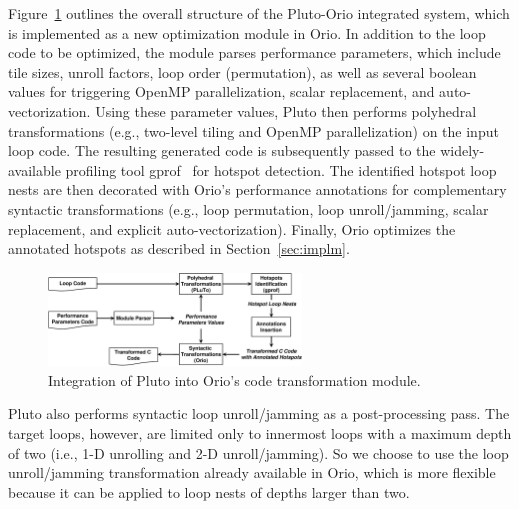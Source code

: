 Figure~\ref{fig:pluto-orio} outlines the overall structure of the Pluto-Orio
integrated system, which is implemented as a new optimization module in
Orio.
In addition to the loop code to be optimized, the module parses performance
parameters, which include tile sizes, unroll factors, loop order
(permutation), as well as several boolean values for triggering OpenMP
parallelization, scalar replacement, and auto-vectorization. Using these
parameter values, Pluto then performs polyhedral transformations (e.g.,
two-level tiling and OpenMP parallelization) on the input loop code. The
resulting generated code is subsequently passed to the widely-available
profiling tool gprof~\cite{gprof} for hotspot detection. 
The identified hotspot loop nests are then decorated with Orio's performance
annotations for complementary syntactic transformations (e.g., loop
permutation, loop unroll/jamming, scalar replacement, and explicit
auto-vectorization). Finally, Orio optimizes the annotated hotspots as 
described in Section~\ref{sec:implm}.

\begin{figure}%
\begin{center}
\includegraphics[width=0.6\textwidth]{figures/pluto-orio.eps}    
\end{center}   
\caption{Integration of Pluto into Orio's code transformation module.}
\label{fig:pluto-orio}
\end{figure}  

Pluto also performs syntactic loop unroll/jamming as a post-processing
pass. The target loops, however, are limited only to innermost loops with a
maximum depth of two (i.e., 1-D unrolling and 2-D unroll/jamming). So we
choose to use the loop unroll/jamming transformation already available in
Orio, which is more flexible because it can be applied to loop nests of
depths larger than two.


